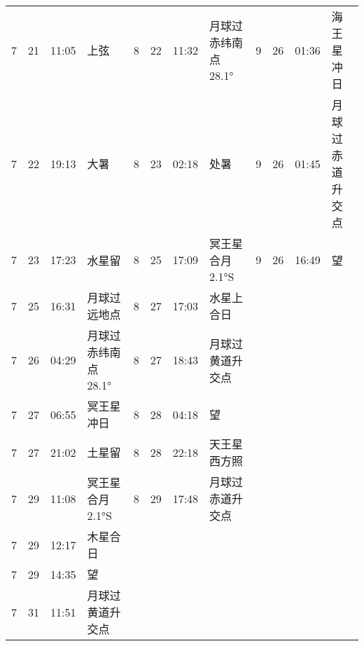 \begin{tabular}{llll|llll|llll}
7 & 21 & 11:05 & 上弦 & 8 & 22 & 11:32 & 月球过赤纬南点 28.1° & 9 & 26 & 01:36 & 海王星冲日 \tabularnewline
7 & 22 & 19:13 & 大暑 & 8 & 23 & 02:18 & 处暑 & 9 & 26 & 01:45 & 月球过赤道升交点 \tabularnewline
7 & 23 & 17:23 & 水星留 & 8 & 25 & 17:09 & 冥王星合月 2.1°S & 9 & 26 & 16:49 & 望 \tabularnewline
7 & 25 & 16:31 & 月球过远地点 & 8 & 27 & 17:03 & 水星上合日 &  &  &  &  \tabularnewline
7 & 26 & 04:29 & 月球过赤纬南点 28.1° & 8 & 27 & 18:43 & 月球过黄道升交点 &  &  &  &  \tabularnewline
7 & 27 & 06:55 & 冥王星冲日 & 8 & 28 & 04:18 & 望 &  &  &  &  \tabularnewline
7 & 27 & 21:02 & 土星留 & 8 & 28 & 22:18 & 天王星西方照 &  &  &  &  \tabularnewline
7 & 29 & 11:08 & 冥王星合月 2.1°S & 8 & 29 & 17:48 & 月球过赤道升交点 &  &  &  &  \tabularnewline
7 & 29 & 12:17 & 木星合日 &  &  &  &  &  &  &  &  \tabularnewline
7 & 29 & 14:35 & 望 &  &  &  &  &  &  &  &  \tabularnewline
7 & 31 & 11:51 & 月球过黄道升交点 &  &  &  &  &  &  &  &  \tabularnewline
\hline \end{tabular}

